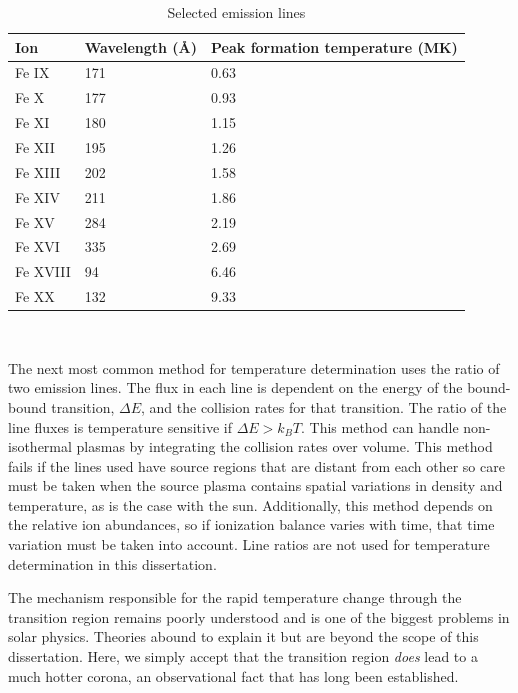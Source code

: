 \begin{table}[!h]
    \caption[Selected emission lines and temperatures]{
        Selected emission lines
    }
    \begin{center}
    \begin{tabular}{|l|l|p{3cm}|} \hline
	Ion & Wavelength (\AA) & Peak formation temperature (MK) \\ \hline \hline
	Fe IX & 171 & 0.63 \\ \hline
	Fe X & 177 & 0.93  \\ \hline
	Fe XI & 180 & 1.15 \\ \hline
	Fe XII & 195 & 1.26 \\ \hline
	Fe XIII & 202 & 1.58 \\ \hline
	Fe XIV & 211 & 1.86 \\ \hline
	Fe XV & 284 & 2.19\\ \hline
	Fe XVI & 335 & 2.69 \\ \hline
	Fe XVIII & 94 & 6.46 \\ \hline
	Fe XX & 132 & 9.33 \\ \hline
	\end{tabular}
    \\ \rule{0mm}{5mm}
    \end{center}
    \label{tab:emissionlines}
\end{table}

The next most common method for temperature determination uses the ratio of two emission lines. The flux in each line is dependent on the energy of the bound-bound transition, $\Delta E$, and the collision rates for that transition. The ratio of the line fluxes is temperature sensitive if $\Delta E > k_BT$. This method can handle non-isothermal plasmas by integrating the collision rates over volume. This method fails if the lines used have source regions that are distant from each other so care must be taken when the source plasma contains spatial variations in density and temperature, as is the case with the sun. Additionally, this method depends on the relative ion abundances, so if ionization balance varies with time, that time variation must be taken into account. Line ratios are not used for temperature determination in this dissertation. 

The mechanism responsible for the rapid temperature change through the transition region remains poorly understood and is one of the biggest problems in solar physics. Theories abound to explain it but are beyond the scope of this dissertation. Here, we simply accept that the transition region \textit{does} lead to a much hotter corona, an observational fact that has long been established. 

